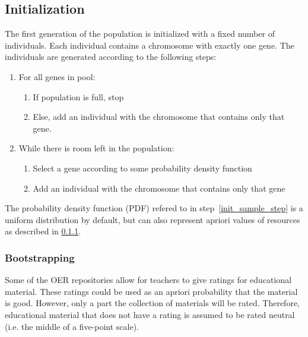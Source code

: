 \begin{itemize}
\subsection{Initialization}
The first generation of the population is initialized with a fixed number of
individuals. Each individual contains a chromosome with exactly one gene. The
individuals are generated according to the following steps:
\begin{enumerate}
	\item For all genes in pool:
		\begin{enumerate}
			\item If population is full, stop
			\item Else, add an individual with the chromosome that contains only that gene.
		\end{enumerate}
	\item While there is room left in the population:
		\begin{enumerate}
			\item \label{init_sample_step}Select a gene according to some probability density function
			\item Add an individual with the chromosome that contains only that
				gene
		\end{enumerate}
\end{enumerate}
The probability density function (PDF) refered to in
step~\ref{init_sample_step} is a uniform distribution by default, but can also
represent apriori values of resources as described in
\ref{sec:approach_bootstrapping}.
\subsubsection{Bootstrapping}
\label{sec:approach_bootstrapping}
Some of the OER repositories allow for teachers to give ratings for educational
material. These ratings could be used as an apriori probability that the
material is good. However, only a part the collection of materials will be
rated. Therefore, educational material that does not have a rating is assumed
to be rated neutral (i.e. the middle of a five-point scale).

\end{itemize}
